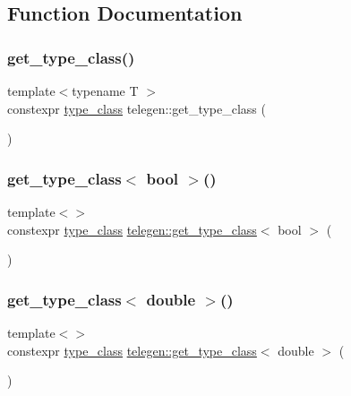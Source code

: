 \subsection{Function Documentation}
\mbox{\label{namespacetelegen_a6ea75c665a463a240f4a40419a810da3}} 
\subsubsection{\texorpdfstring{get\+\_\+type\+\_\+class()}{get\_type\_class()}}
{\footnotesize\ttfamily template$<$typename T $>$ \\
constexpr \hyperlink{namespacetelegen_a72d4e69f0be1731e1a851a96dec858d8}{type\+\_\+class} telegen\+::get\+\_\+type\+\_\+class (\begin{DoxyParamCaption}{ }\end{DoxyParamCaption})}

\mbox{\label{namespacetelegen_a63a694a138c7ec92f0d7ee249ba207cd}} 
\subsubsection{\texorpdfstring{get\+\_\+type\+\_\+class$<$ bool $>$()}{get\_type\_class< bool >()}}
{\footnotesize\ttfamily template$<$$>$ \\
constexpr \hyperlink{namespacetelegen_a72d4e69f0be1731e1a851a96dec858d8}{type\+\_\+class} \hyperlink{namespacetelegen_a6ea75c665a463a240f4a40419a810da3}{telegen\+::get\+\_\+type\+\_\+class}$<$ bool $>$ (\begin{DoxyParamCaption}{ }\end{DoxyParamCaption})}

\mbox{\label{namespacetelegen_a22e19e6aeb49b070760d26eb1f4e996a}} 
\subsubsection{\texorpdfstring{get\+\_\+type\+\_\+class$<$ double $>$()}{get\_type\_class< double >()}}
{\footnotesize\ttfamily template$<$$>$ \\
constexpr \hyperlink{namespacetelegen_a72d4e69f0be1731e1a851a96dec858d8}{type\+\_\+class} \hyperlink{namespacetelegen_a6ea75c665a463a240f4a40419a810da3}{telegen\+::get\+\_\+type\+\_\+class}$<$ double $>$ (\begin{DoxyParamCaption}{ }\end{DoxyParamCaption})}

